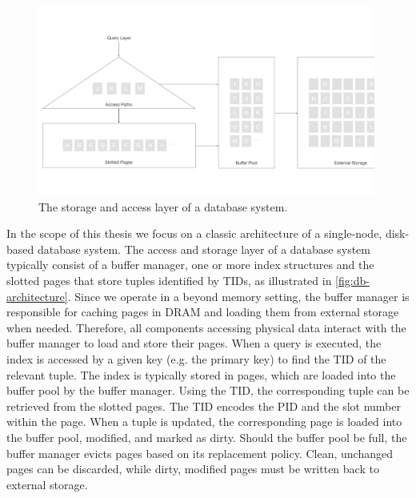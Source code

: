 
\begin{figure}[htpb]
  \centering
  \includegraphics[width=0.99\textwidth]{figures/db_architecture.pdf}
  \caption{The storage and access layer of a database system.}
  \label{fig:db-architecture}
\end{figure}

In the scope of this thesis we focus on a classic architecture of a single-node, disk-based database system.
The access and storage layer of a database system typically consist of a buffer manager, one or more index structures and the slotted pages that store tuples identified by \ac{TID}s, as illustrated in \autoref{fig:db-architecture}.
Since we operate in a beyond memory setting, the buffer manager is responsible for caching pages in \ac{DRAM} and loading them from external storage when needed.
Therefore, all components accessing physical data interact with the buffer manager to load and store their pages.
When a query is executed, the index is accessed by a given key (e.g. the primary key) to find the \ac{TID} of the relevant tuple.
The index is typically stored in pages, which are loaded into the buffer pool by the buffer manager.
Using the \ac{TID}, the corresponding tuple can be retrieved from the slotted pages.
The \ac{TID} encodes the \ac{PID} and the slot number within the page.
When a tuple is updated, the corresponding page is loaded into the buffer pool, modified, and marked as dirty.
Should the buffer pool be full, the buffer manager evicts pages based on its replacement policy.
Clean, unchanged pages can be discarded, while dirty, modified pages must be written back to external storage.


